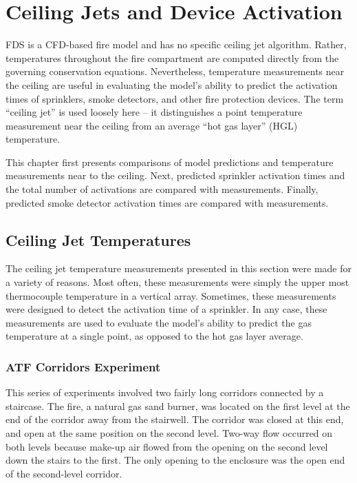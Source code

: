 
\chapter{Ceiling Jets and Device Activation}

FDS is a CFD-based fire model and has no specific ceiling jet algorithm. Rather, temperatures throughout the fire compartment are computed directly from the governing conservation equations. Nevertheless, temperature measurements near the ceiling are useful in evaluating the model's ability to predict the activation times of sprinklers, smoke detectors, and other fire protection devices. The term ``ceiling jet'' is used loosely here -- it distinguishes a point temperature measurement near the ceiling from an average ``hot gas layer'' (HGL) temperature.

This chapter first presents comparisons of model predictions and temperature measurements near to the ceiling. Next, predicted sprinkler activation times and the total number of activations are compared with measurements. Finally, predicted smoke detector activation times are compared with measurements.

\section{Ceiling Jet Temperatures}

The ceiling jet temperature measurements presented in this section were made for a variety of reasons. Most often, these measurements were simply the upper most thermocouple temperature in a vertical array. Sometimes, these measurements were designed to detect the activation time of a sprinkler. In any case, these measurements are used to evaluate the model's ability to predict the gas temperature at a single point, as opposed to the hot gas layer average.

\clearpage

\subsection{ATF Corridors Experiment}

This series of experiments involved two fairly long corridors connected by a staircase. The fire, a natural gas sand burner, was located on the first level at the end of the corridor away from the stairwell. The corridor was closed at this end, and open at the same position on the
second level. Two-way flow occurred on both levels because make-up air flowed from the opening on the second level down
the stairs to the first. The only opening to the enclosure was the open end of the second-level corridor.

